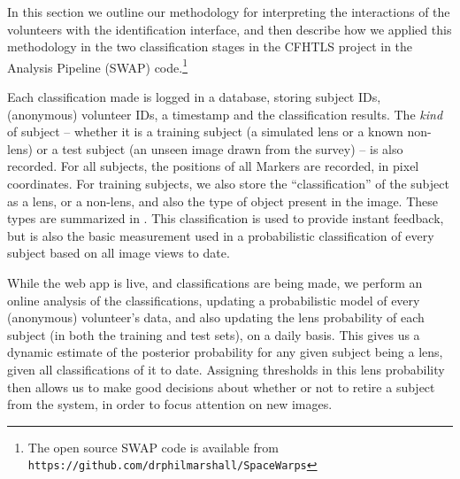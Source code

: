 \documentclass[useAMS,usenatbib,a4paper]{mn2e}
\begin{document}
In this section we outline our methodology for interpreting the interactions
of the volunteers with the identification interface, and then describe how we
applied this methodology in the two classification stages in the CFHTLS
project in the \sw Analysis Pipeline (SWAP) code.\footnote{The open source 
SWAP code is available from 
\texttt{https://github.com/drphilmarshall/SpaceWarps}}

Each classification made is logged in a database, storing subject IDs,
(anonymous) volunteer IDs, a timestamp and the classification results.  The
{\it kind} of subject -- whether it is a training subject (a simulated lens
or a known non-lens) or a test subject (an unseen image drawn from the survey)
-- is also recorded. For all subjects, the positions of all Markers are
recorded, in pixel coordinates. For training subjects, we also store the
``classification'' of the subject as a lens, or a non-lens, and also the type
of object present in the image. These types are summarized in
.  This classification is used to provide instant
feedback, but is also the basic measurement used in a probabilistic
classification of every subject based on all image views to date.

While the \sw web app is live, and classifications are being made, we 
perform an online analysis of the classifications,  updating a
probabilistic model of every (anonymous) volunteer's data, and also updating
the lens probability of each subject  (in both the training and test sets), on
a daily basis. This gives us a dynamic estimate of the posterior probability
for  any given  subject being a lens, given all classifications of it to date.
Assigning thresholds in this lens probability then allows us to make good
decisions about whether or not to retire a subject from the system, in order to
focus attention on new images. 
\end{document}
